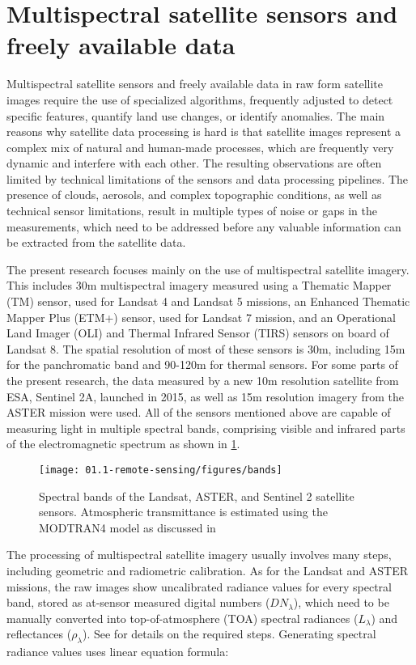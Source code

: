 \section{Multispectral satellite sensors and freely available data}

Multispectral satellite sensors and freely available data in raw form satellite images require the use of specialized algorithms, frequently adjusted to detect specific features, quantify land use changes, or identify anomalies. The main reasons why satellite data processing is hard is that satellite images represent a complex mix of natural and human-made processes, which are frequently very dynamic and interfere with each other. The resulting observations are often limited by technical limitations of the sensors and data processing pipelines. The presence of clouds, aerosols, and complex topographic conditions, as well as technical sensor limitations, result in multiple types of noise or gaps in the measurements, which need to be addressed before any valuable information can be extracted from the satellite data.

The present research focuses mainly on the use of multispectral satellite imagery. This includes 30m multispectral imagery measured using a Thematic Mapper (TM) sensor, used for Landsat 4 and Landsat 5 missions, an Enhanced Thematic Mapper Plus (ETM+) sensor, used for Landsat 7 mission, and an Operational Land Imager (OLI) and Thermal Infrared Sensor (TIRS) sensors on board of Landsat 8. The spatial resolution of most of these sensors is 30m, including 15m for the panchromatic band and 90-120m for thermal sensors. For some parts of the present research, the data measured by a new 10m resolution satellite from ESA, Sentinel 2A, launched in 2015, as well as 15m resolution imagery from the ASTER mission were used. All of the sensors mentioned above are capable of measuring light in multiple spectral bands, comprising visible and infrared parts of the electromagnetic spectrum as shown in \ref{fig:sensor-bands}.

\begin{figure}
	\texttt{[image: 01.1-remote-sensing/figures/bands]}
	\caption{Spectral bands of the Landsat, ASTER, and Sentinel 2 satellite sensors. Atmospheric transmittance is estimated using the MODTRAN4 model as discussed in \citet{verhoef2003simulation}}
	\label{fig:sensor-bands}
\end{figure}

The processing of multispectral satellite imagery usually involves many steps, including geometric and radiometric calibration. As for the Landsat and ASTER missions, the raw images show uncalibrated radiance values for every spectral band, stored as at-sensor measured digital numbers ($DN_\lambda$), which need to be manually converted into top-of-atmosphere (TOA) spectral radiances ($L_\lambda$) and reflectances ($\rho_\lambda$). See \citet{chander2009summary} for details on the required steps. Generating spectral radiance values uses linear equation formula: 

